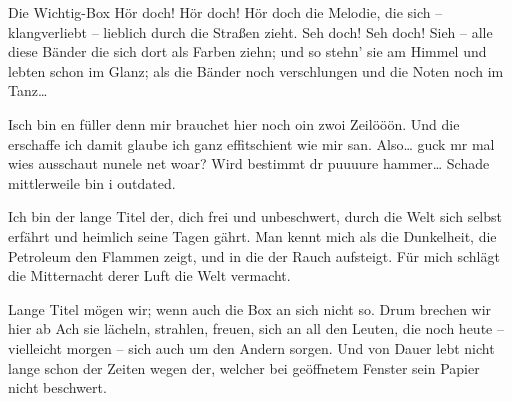 \documentclass[twocolumn]{article}
\begin{document}
    \blindtext

    \begin{definition*}{Die Wichtig-Box}
        Hör doch! Hör doch! Hör doch die Melodie, die sich -- klangverliebt -- lieblich durch die Straßen zieht. 
        Seh doch! Seh doch! Sieh -- alle diese Bänder die sich dort
        als Farben ziehn; und so stehn' sie am Himmel und lebten
        schon im Glanz; als die Bänder noch verschlungen und
        die Noten noch im Tanz\ldots
    \end{definition*}

    \blindtext[1]

    Isch bin en füller denn mir brauchet hier noch oin zwoi Zeilööön.  Und die erschaffe ich damit glaube ich ganz effitschient wie mir san. Also\ldots{} guck mr mal wies ausschaut nunele net woar? Wird bestimmt dr puuuure hammer\ldots
    Schade mittlerweile bin i outdated.
    \begin{definition}{Ich bin der lange Titel der, dich frei und unbeschwert, durch die Welt sich selbst erfährt und heimlich seine Tagen gährt.}
        Man kennt mich als die Dunkelheit, die Petroleum den Flammen zeigt, und in die der Rauch aufsteigt.
        Für mich schlägt die Mitternacht derer Luft die Welt
        vermacht.
    \end{definition}

    \blindtext

    \begin{definition*}{Lange Titel mögen wir; wenn auch die Box an sich nicht so. Drum brechen wir hier ab}
        Ach sie lächeln, strahlen, freuen, sich an all den Leuten,
        die noch heute -- vielleicht morgen -- sich auch um den Andern sorgen. Und von Dauer lebt nicht lange schon der Zeiten wegen
        der, welcher bei geöffnetem Fenster sein Papier nicht beschwert.
    \end{definition*}

    \blindtext

    \listofdefinitions
    \listofremarks
\end{document}
